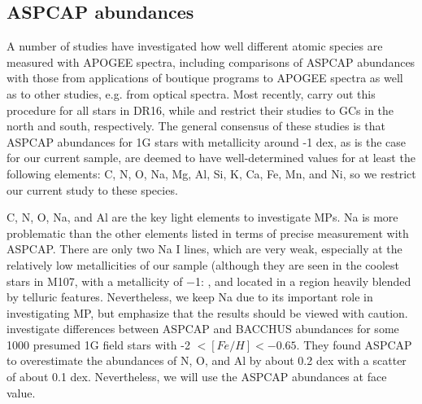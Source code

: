 \documentclass[onecolumn]{aa}
\begin{document}
\subsection{ASPCAP abundances}
A number of studies have investigated how well different atomic species are measured with APOGEE spectra, including comparisons of ASPCAP abundances with those from applications of boutique programs to APOGEE spectra as well as to other studies, e.g. from optical spectra. Most recently, \citet{Henrik2020} carry out this procedure for all stars in DR16, while \citet{Masseron2019} and \citet{Meszaros2020} restrict their studies to GCs in the north and south, respectively. The general consensus of these studies is that ASPCAP abundances for 1G stars with metallicity around -1 dex, as is the case for our current sample, are deemed to have well-determined values for at least the following elements: C, N, O, Na, Mg, Al, Si, K, Ca, Fe, Mn, and Ni, so we restrict our current study to these species.

C, N, O, Na, and Al are the key light elements to investigate MPs.
Na is more problematic than the other elements listed in terms of precise measurement with ASPCAP. There are only two Na I lines, which are very weak, especially at the relatively low metallicities of our sample (although they are seen in the coolest stars in M107, with a metallicity of $-$1: \citet{Masseron2019}, and located in a region heavily blended by telluric features. Nevertheless, we keep Na due to its important role in investigating MP, but emphasize that the results should be viewed with caution. \citet{Fernandez-Trincado2020} investigate differences between ASPCAP and BACCHUS abundances for some 1000 presumed 1G field stars with -2 $<[Fe/H]<-0.65$. They found ASPCAP to overestimate the abundances of N, O, and Al by about 0.2 dex with a scatter of about 0.1 dex. Nevertheless, we will use the ASPCAP abundances at face value.
\end{document}
